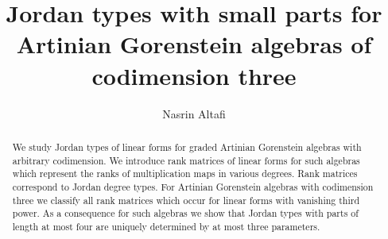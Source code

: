 \documentclass[12pt]{amsart}
\numberwithin{equation}{section}
\theoremstyle{plain} \newtheorem{theorem}{Theorem}[section]
\theoremstyle{definition} \newtheorem{definition}[theorem]{Definition}
\begin{document}
\author{Nasrin Altafi} \address{Department of Mathematics, KTH Royal
  Institute of Technology, S-100 44 Stockholm, Sweden}


\title[]{Jordan types with small parts for Artinian Gorenstein algebras of codimension three}
\maketitle

\begin{abstract}
We study Jordan types of linear forms for  graded Artinian  Gorenstein algebras with arbitrary codimension. We introduce rank matrices of linear forms for such algebras which represent the ranks of multiplication maps in various degrees. Rank matrices correspond to Jordan degree types. For Artinian Gorenstein algebras with codimension three we classify all rank matrices which occur for linear forms with vanishing third power. As a consequence for such algebras we show that Jordan types with parts of length at most four are uniquely determined by at most three parameters.
\end{abstract}
\end{document}
